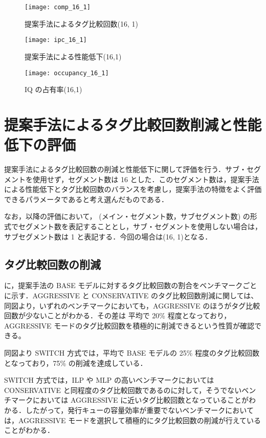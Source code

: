 \begin{figure}[htb]
  \centering
  \texttt{[image: comp\_16\_1]}
  \caption{提案手法によるタグ比較回数(16, 1)}
  \label{fig:comp_16_1}
\end{figure}
\begin{figure}[htb]
  \centering
  \texttt{[image: ipc\_16\_1]}
  \caption{提案手法による性能低下(16,1)}
  \label{fig:ipc_16_1}
\end{figure}
\begin{figure}[htb]
  \centering
  \texttt{[image: occupancy\_16\_1]}
  \caption{IQ の占有率(16,1)}
  \label{fig:occupancy_16_1}
\end{figure}

\section{提案手法によるタグ比較回数削減と性能低下の評価}
提案手法によるタグ比較回数の削減と性能低下に関して評価を行う．サブ・セグメントを使用せず，セグメント数は 16 とした．このセグメント数は，提案手法による性能低下とタグ比較回数のバランスを考慮し，提案手法の特徴をよく評価できるパラメータであると考え選んだものである．

なお，以降の評価において， (メイン・セグメント数，サブセグメント数) の形式でセグメント数を表記することとし，サブ・セグメントを使用しない場合は，サブセグメント数は 1 と表記する．今回の場合は(16, 1)となる．

\subsection{タグ比較回数の削減}
に，提案手法の BASE モデルに対するタグ比較回数の割合をベンチマークごとに示す．AGGRESSIVE と CONSERVATIVE のタグ比較回数削減に関しては、同図より，いずれのベンチマークにおいても，AGGRESSIVE のほうがタグ比較回数が少ないことがわかる．その差は 平均で 20\% 程度となっており，AGGRESSIVE モードのタグ比較回数を積極的に削減できるという性質が確認できる。

同図より SWITCH 方式では，平均で BASE モデルの 25\% 程度のタグ比較回数となっており，75\% の削減を達成している．

SWITCH 方式では，ILP や MLP の高いベンチマークにおいては CONSERVATIVE と同程度のタグ比較回数であるのに対して，そうでないベンチマークにおいては AGGRESSIVE に近いタグ比較回数となっていることがわかる．したがって，発行キューの容量効率が重要でないベンチマークにおいては，AGGRESSIVE モードを選択して積極的にタグ比較回数の削減が行えていることがわかる．

